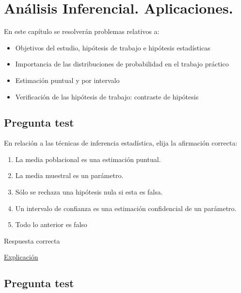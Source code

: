 \documentclass[
]{book}
\providecommand{\tightlist}{%
  \setlength{\itemsep}{0pt}\setlength{\parskip}{0pt}}
\begin{document}
\hypertarget{anuxe1lisis-inferencial.-aplicaciones.}{%
\chapter{Análisis Inferencial. Aplicaciones.}\label{anuxe1lisis-inferencial.-aplicaciones.}}

En este capítulo se resolverán problemas relativos a:

\begin{itemize}
\tightlist
\item
  Objetivos del estudio, hipótesis de trabajo e hipótesis estadísticas
\item
  Importancia de las distribuciones de probabilidad en el trabajo práctico
\item
  Estimación puntual y por intervalo
\item
  Verificación de las hipótesis de trabajo: contraste de hipótesis
\end{itemize}

\hypertarget{pregunta-test-91}{%
\section{Pregunta test}\label{pregunta-test-91}}

En relación a las técnicas de inferencia estadística, elija la afirmación correcta:

\begin{enumerate}
\def\labelenumi{\alph{enumi})}
\tightlist
\item
  La media poblacional es una estimación puntual.
\item
  La media muestral es un parámetro.
\item
  Sólo se rechaza una hipótesis nula si esta es falsa.
\item
  Un intervalo de confianza es una estimación confidencial de un parámetro.
\item
  Todo lo anterior es falso
\end{enumerate}

Respuesta correcta

\href{https://1fjmanzano.github.io/bioestadistica/estimacio\%CC\%81n-de-para\%CC\%81metros.-intervalos-de-confianza.html}{Explicación}

\hypertarget{pregunta-test-92}{%
\section{Pregunta test}\label{pregunta-test-92}}
\end{document}
